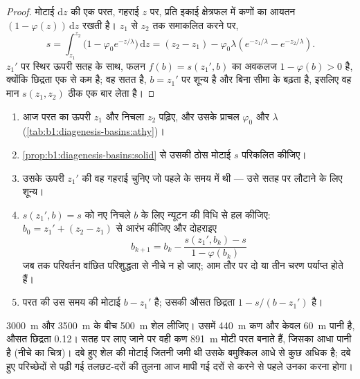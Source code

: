 \begin{proof}
मोटाई $\mathrm dz$ की एक परत, गहराई $z$ पर, प्रति इकाई क्षेत्रफल में कणों का आयतन $(1 - \varphi(z))\,\mathrm dz$ रखती है। $z_1$ से $z_2$ तक समाकलित करने पर,
\[
  s = \int_{z_1}^{z_2} \bigl(1 - \varphi_0 e^{-z/\lambda}\bigr)\,\mathrm dz
    = (z_2 - z_1) - \varphi_0\lambda\left(e^{-z_1/\lambda} - e^{-z_2/\lambda}\right).
\]
$z_1'$ पर स्थिर ऊपरी सतह के साथ, फलन $f(b) = s(z_1', b)$ का अवकलज $1 - \varphi(b) > 0$ है, क्योंकि छिद्रता एक से कम है; वह सतत है, $b = z_1'$ पर शून्य है और बिना सीमा के बढ़ता है, इसलिए वह मान $s(z_1, z_2)$ ठीक एक बार लेता है।
\end{proof}

\begin{method}[एक परत का डिकंपैक्शन]\label{met:b1:diagenesis-basins:decompaction}
\begin{enumerate}
  \item आज परत का ऊपरी $z_1$ और निचला $z_2$ पढ़िए, और उसके प्राचल $\varphi_0$ और $\lambda$
        (\cref{tab:b1:diagenesis-basins:athy})।
  \item \cref{prop:b1:diagenesis-basins:solid} से उसकी ठोस मोटाई $s$ परिकलित कीजिए।
  \item उसके ऊपरी $z_1'$ की वह गहराई चुनिए जो पहले के समय में थी --- उसे सतह पर लौटाने के लिए शून्य।
  \item $s(z_1', b) = s$ को नए निचले $b$ के लिए न्यूटन की विधि से हल कीजिए:
        $b_0 = z_1' + (z_2 - z_1)$ से आरंभ कीजिए और दोहराइए
        \[
          b_{k+1} = b_k - \frac{s(z_1', b_k) - s}{1 - \varphi(b_k)}
        \]
        जब तक परिवर्तन वांछित परिशुद्धता से नीचे न हो जाए; आम तौर पर दो या तीन चरण पर्याप्त होते हैं।
  \item परत की उस समय की मोटाई $b - z_1'$ है; उसकी औसत छिद्रता $1 - s/(b - z_1')$ है।
\end{enumerate}
\end{method}

\qty{3000}{m} और \qty{3500}{m} के बीच \qty{500}{m} शेल लीजिए। उसमें \qty{440}{m} कण और केवल \qty{60}{m} पानी है, औसत छिद्रता \num{0.12}। सतह पर लाए जाने पर वही कण \qty{891}{m} मोटी परत बनाते हैं, जिसका आधा पानी है (नीचे का चित्र)। दबे हुए शेल की मोटाई जितनी जमी थी उसके बमुश्किल आधे से कुछ अधिक है; दबे हुए परिच्छेदों से पढ़ी गई तलछट-दरों की तुलना आज मापी गई दरों से करने से पहले उनका  करना होगा।


